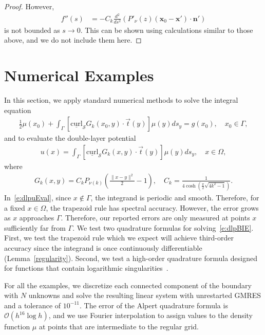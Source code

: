 \documentclass[final]{siamltex}
\newcommand{\C}{C_k}
\renewcommand{\S} {\mathcal{S}}
\begin{document}
\begin{proof}
However,
\begin{align*} 
  f''(s) &= -\C \frac{d^2}{ds^2}\left( P'_\nu(z) 
  (\mathbf{x}_{0}-\mathbf{x'}) \cdot \mathbf{n'} \right)
\end{align*}
is not bounded as $s\rightarrow 0$. This can be shown using calculations
similar to those above, and we do not include them here.
\end{proof}


\section{Numerical Examples}
\label{s:numerics}
In this section, we apply standard numerical methods to solve the
integral equation
\begin{align}
  \label{e:dlpBIE}
  \frac{1}{2}\mu(x_{0}) + \int_{\Gamma}
    [\underline{\mbox{curl}}_{\S}G_{k}(x_{0},y) \cdot
    \vec{t}(y)] \mu(y)ds_{y} = g(x_{0}), \quad x_{0} \in \Gamma,
\end{align}
and to evaluate the double-layer potential
\begin{align}
  \label{e:dlpuEval}
  u(x) = \int_{\Gamma} [\underline{\mbox{curl}}_{\S}G_{k}(x,y) 
    \cdot \vec{t}(y)] \mu(y)ds_{y}, \quad x \in \Omega,
\end{align}
where
\begin{align*}
  G_{k}(x,y) = \C P_{\nu(k)} \left(
    \frac{\|x - y\|^{2}}{2} - 1\right), \quad 
  \C = \frac{1}{4\cosh\left(\frac{\pi}{2}\sqrt{4k^{2}-1}\right)}.
\end{align*}
In~\eqref{e:dlpuEval}, since $x \notin \Gamma$, the integrand is
periodic and smooth.  Therefore, for a fixed $x\in \Omega$, the
trapezoid rule has spectral accuracy.  However, the error grows as $x$
approaches $\Gamma$.  Therefore, our reported errors are only measured
at points $x$ sufficiently far from $\Gamma$.  We test two quadrature
formulas for solving~\eqref{e:dlpBIE}.  First, we test the trapezoid
rule which we expect will achieve third-order accuracy since the
integrand is once continuously differentiable (Lemma~\ref{regularity}).
Second, we test a high-order quadrature formula designed for functions
that contain logarithmic singularities~\cite{alpert}.

For all the examples, we discretize each connected component of the
boundary with $N$ unknowns and solve the resulting linear system with
unrestarted GMRES and a tolerance of $10^{-11}$.  The error of the
Alpert quadrature formula is $\mathcal{O}(h^{16}\log h)$, and we use
Fourier interpolation to assign values to the density function $\mu$ at
points that are intermediate to the regular grid.
\end{document}
